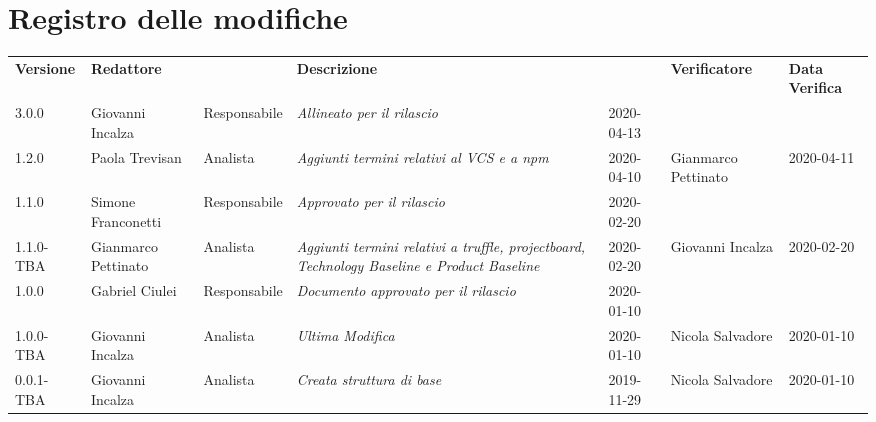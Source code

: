 \section*{Registro delle modifiche}
\renewcommand{\arraystretch}{1.8}
  \setlength\LTleft{-1.7cm}
  \begin{longtable}{|p{1.7cm}|p{2cm}|p{2.5cm}|p{3cm}|p{1.7cm}|p{2cm}|p{2.3cm}|}
    \hline
    \rowcolor{header}
    \textbf{Versione} & \textbf{Redattore} & \centering{\textbf{Ruolo}} & \textbf{Descrizione} &      \centering{\textbf{Data}} & \textbf{Verificatore} & \textbf{Data Verifica} \\
    3.0.0 & Giovanni Incalza & Responsabile & \small{\textit{Allineato per il rilascio}} & 2020-04-13 & & \\
    1.2.0 & Paola Trevisan & Analista & \small{\textit{Aggiunti termini relativi al VCS e a npm}} & 2020-04-10 & Gianmarco Pettinato & 2020-04-11 \\
    1.1.0 & Simone Franconetti & Responsabile & \small{\textit{Approvato per il rilascio}} & 2020-02-20 & & \\
    1.1.0-TBA & Gianmarco Pettinato & Analista & \small{\textit{Aggiunti termini relativi a truffle, projectboard, Technology Baseline e Product Baseline}} & 2020-02-20 & Giovanni Incalza & 2020-02-20\\
    1.0.0 & Gabriel Ciulei & Responsabile & \small{\textit{ Documento approvato per il rilascio }} & 2020-01-10 & &\\
    1.0.0-TBA & Giovanni Incalza & Analista & \small{\textit{ Ultima Modifica }} & 2020-01-10 & Nicola Salvadore & 2020-01-10\\
    0.0.1-TBA & Giovanni Incalza & Analista & \small{\textit{ Creata struttura di base }} & 2019-11-29 & Nicola Salvadore & 2020-01-10 \\
    \hline
  \end{longtable}
  \setlength\LTleft{0cm}

